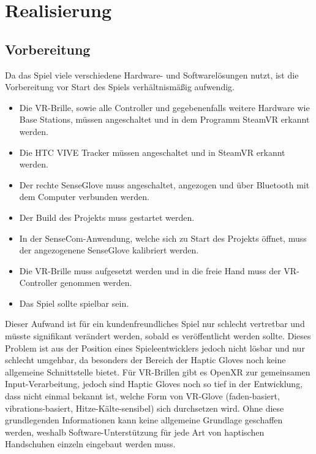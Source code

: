 \chapter{Realisierung}

\section{Vorbereitung}
Da das Spiel viele verschiedene Hardware- und Softwarelösungen nutzt, ist die Vorbereitung vor Start des Spiels verhältnismäßig aufwendig.

\begin{itemize}
    \item Die VR-Brille, sowie alle Controller und gegebenenfalls weitere Hardware wie \dq Base Stations\dq, müssen angeschaltet und in dem Programm SteamVR erkannt werden.
    \item Die HTC VIVE Tracker müssen angeschaltet und in SteamVR erkannt werden.
    \item Der rechte SenseGlove muss angeschaltet, angezogen und über Bluetooth mit dem Computer verbunden werden.
    \item Der Build des Projekts muss gestartet werden.
    \item In der SenseCom-Anwendung, welche sich zu Start des Projekts öffnet, muss der angezogenene SenseGlove kalibriert werden.
    \item Die VR-Brille muss aufgesetzt werden und in die freie Hand muss der VR-Controller genommen werden.
    \item Das Spiel sollte spielbar sein.
\end{itemize}

Dieser Aufwand ist für ein kundenfreundliches Spiel nur schlecht vertretbar und müsste signifikant verändert werden, sobald es veröffentlicht werden sollte. Dieses Problem ist aus der Position eines Spieleentwicklers jedoch nicht lösbar und nur schlecht umgehbar, da besonders der Bereich der Haptic Gloves noch keine allgemeine Schnittstelle bietet. Für VR-Brillen gibt es OpenXR zur gemeinsamen Input-Verarbeitung, jedoch sind Haptic Gloves noch so tief in der Entwicklung, dass nicht einmal bekannt ist, welche Form von VR-Glove (faden-basiert, vibrations-basiert, Hitze-Kälte-sensibel) sich durchsetzen wird. Ohne diese grundlegenden Informationen kann keine allgemeine Grundlage geschaffen werden, weshalb Software-Unterstützung für jede Art von haptischen Handschuhen einzeln eingebaut werden muss.\\


